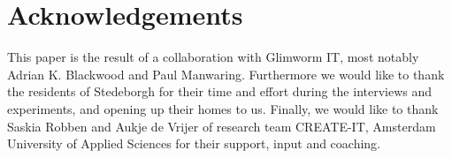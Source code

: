 \documentclass{below-ext}
\begin{document}
\section{Acknowledgements}

This paper is the result of a collaboration with Glimworm IT, most notably Adrian K. Blackwood and Paul Manwaring. Furthermore we would like to thank the residents of Stedeborgh for their time and effort during the interviews and experiments, and opening up their homes to us. Finally, we would like to thank Saskia Robben and Aukje de Vrijer of research team CREATE-IT, Amsterdam University of Applied Sciences for their support, input and coaching.

\nocite{Kanis:2013:SMH:2534504.2534526}
\nocite{Robben:2013:LRA:2534504.2534555}
\nocite{langerzelfstandig}
\nocite{NaitAicha:2013:LYG:2494091.2497283}
\nocite{stedeborgh}
\nocite{Nehmer:2006:LAS:1134285.1134293}
\balance


\end{document}
